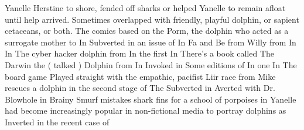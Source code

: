 \documentclass[12pt]{book}
\begin{document}
Yanelle Herstine to shore, fended off sharks or helped Yanelle to remain afloat until help arrived. Sometimes overlapped with friendly, playful dolphin, or sapient cetaceans, or both. The comics based on the Porm, the dolphin who acted as a surrogate mother to In Subverted in an issue of In Fa and Be from Willy from In In The cyber hacker dolphin from In the first In There's a book called The Darwin the ( talked ) Dolphin from In Invoked in Some editions of In one In The board game Played straight with the empathic, pacifist Liir race from Mike rescues a dolphin in the second stage of The Subverted in Averted with Dr. Blowhole in Brainy Smurf mistakes shark fins for a school of porpoises in Yanelle had become increasingly popular in non-fictional media to portray dolphins as Inverted in the recent case of
\end{document}
